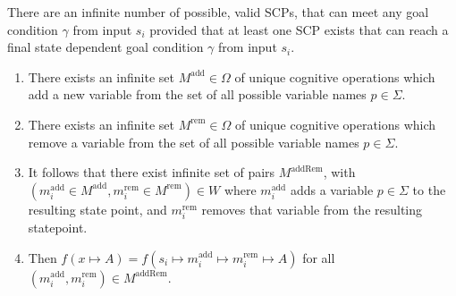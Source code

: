 \begin{lemma}\label{lemma:infiniteSCPs}
There are an infinite number of possible, valid SCPs, that can meet any goal condition $\gamma$ from input $s_i$ provided that at least one SCP exists that can reach a final state dependent goal condition $\gamma$ from input $s_i$.
\end{lemma}
\begin{bulletProof} \label{proof:infiniteSCPs}

\begin{enumerate}
\item There exists an infinite set  $M^\text{add} \in \Omega$ of unique cognitive operations which add a new variable from the set of all possible variable names $p \in \Sigma$.
\item There exists an infinite set $M^\text{rem} \in \Omega$ of unique cognitive operations  which remove a variable from the set of all possible variable names  $p \in \Sigma$.
\item It follows that there exist infinite set of pairs $M^\text{addRem}$, with $(m^\text{add}_i \in M^\text{add}, m^\text{rem}_i \in M^\text{rem}) \in W$ where $m^\text{add}_i$ adds a variable $p \in \Sigma$ to the resulting state point, and $m^\text{rem}_i$ removes that variable from the resulting statepoint.
\item Then $f(x \longmapsto A) = f(s_i \longmapsto m^\text{add}_i \longmapsto m^\text{rem}_i \longmapsto A)$ for all $(m^\text{add}_i, m^\text{rem}_i) \in M^\text{addRem}$.
\end{enumerate}
\end{bulletProof}













